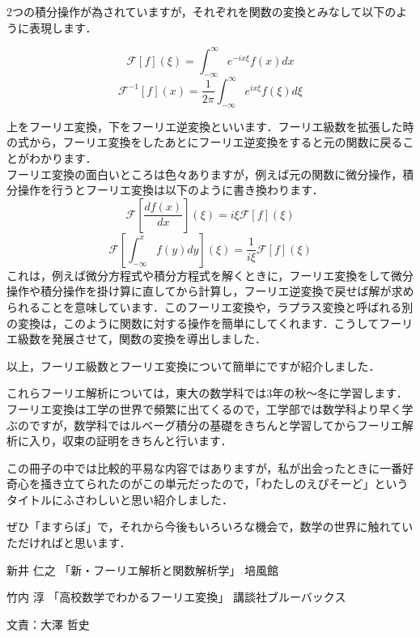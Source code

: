 2つの積分操作が為されていますが，それぞれを関数の変換とみなして以下のように表現します．

\[
  \mathcal{F}[f](\xi) = \int_{-\infty}^\infty e^{-ix\xi} f(x) dx
\]
\[
  \mathcal{F}^{-1}[f](x) = \frac{1}{2\pi} \int_{-\infty}^\infty e^{ix\xi} f(\xi) d\xi
\]

上をフーリエ変換，下をフーリエ逆変換といいます．フーリエ級数を拡張した時の式から，フーリエ変換をしたあとにフーリエ逆変換をすると元の関数に戻ることがわかります．\\
フーリエ変換の面白いところは色々ありますが，例えば元の関数に微分操作，積分操作を行うとフーリエ変換は以下のように書き換わります．\\
\[
  \mathcal{F}[\frac{df(x)}{dx}](\xi) = i\xi \mathcal{F}[f](\xi)
\]
\[
  \mathcal{F}[\int_{-\infty}^x f(y) dy](\xi) =\frac{1}{i\xi} \mathcal{F}[f](\xi)
\]
これは，例えば微分方程式や積分方程式を解くときに，フーリエ変換をして微分操作や積分操作を掛け算に直してから計算し，フーリエ逆変換で戻せば解が求められることを意味しています．このフーリエ変換や，ラプラス変換と呼ばれる別の変換は，このように関数に対する操作を簡単にしてくれます．こうしてフーリエ級数を発展させて，関数の変換を導出しました．

以上，フーリエ級数とフーリエ変換について簡単にですが紹介しました．

これらフーリエ解析については，東大の数学科では3年の秋〜冬に学習します．フーリエ変換は工学の世界で頻繁に出てくるので，工学部では数学科より早く学ぶのですが，数学科ではルベーグ積分の基礎をきちんと学習してからフーリエ解析に入り，収束の証明をきちんと行います．

この冊子の中では比較的平易な内容ではありますが，私が出会ったときに一番好奇心を掻き立てられたのがこの単元だったので，「わたしのえぴそーど」というタイトルにふさわしいと思い紹介しました．

ぜひ「ますらぼ」で，それから今後もいろいろな機会で，数学の世界に触れていただければと思います．
\begin{thebibliography}{9}
\item 新井 仁之 「新・フーリエ解析と関数解析学」 培風館
\item 竹内 淳 「高校数学でわかるフーリエ変換」 講談社ブルーバックス
\end{thebibliography}

文責：大澤 哲史
